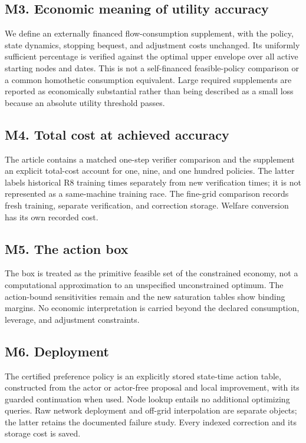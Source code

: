 \subsection*{M3. Economic meaning of utility accuracy}
We define an externally financed flow-consumption supplement, with the policy, state dynamics, stopping bequest, and adjustment costs unchanged. Its uniformly sufficient percentage is verified against the optimal upper envelope over all active starting nodes and dates. This is not a self-financed feasible-policy comparison or a common homothetic consumption equivalent. Large required supplements are reported as economically substantial rather than being described as a small loss because an absolute utility threshold passes.

\subsection*{M4. Total cost at achieved accuracy}
The article contains a matched one-step verifier comparison and the supplement an explicit total-cost account for one, nine, and one hundred policies. The latter labels historical R8 training times separately from new verification times; it is not represented as a same-machine training race. The fine-grid comparison records fresh training, separate verification, and correction storage. Welfare conversion has its own recorded cost.

\subsection*{M5. The action box}
The box is treated as the primitive feasible set of the constrained economy, not a computational approximation to an unspecified unconstrained optimum. The action-bound sensitivities remain and the new saturation tables show binding margins. No economic interpretation is carried beyond the declared consumption, leverage, and adjustment constraints.

\subsection*{M6. Deployment}
The certified preference policy is an explicitly stored state-time action table, constructed from the actor or actor-free proposal and local improvement, with its guarded continuation when used. Node lookup entails no additional optimizing queries. Raw network deployment and off-grid interpolation are separate objects; the latter retains the documented failure study. Every indexed correction and its storage cost is saved.

